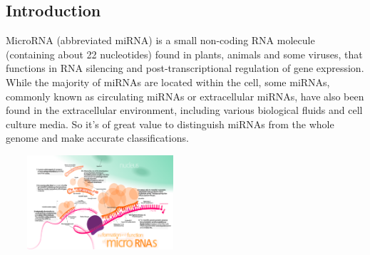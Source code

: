 \documentclass[letterpaper, 11pt]{article}
\newenvironment{Figure}
  {\par\medskip\noindent\minipage{\linewidth}}
  {\endminipage\par\medskip}
\begin{document}
\begin{multicols*}{2}
\section{Introduction}
{
MicroRNA (abbreviated miRNA) is a small non-coding RNA molecule (containing about 22 nucleotides) found in plants, animals and some viruses, that functions in RNA silencing and post-transcriptional regulation of gene expression. While the majority of miRNAs are located within the cell, some miRNAs, commonly known as circulating miRNAs or extracellular miRNAs, have also been found in the extracellular environment, including various biological fluids and cell culture media. So it's of great value to distinguish miRNAs from the whole genome and make accurate classifications.
~\cite{miRNA}
\begin{Figure}
\includegraphics[height = 3.5cm, width = 7cm]{miRNA.png}
\end{Figure}

}
\end{multicols*}
\end{document}
